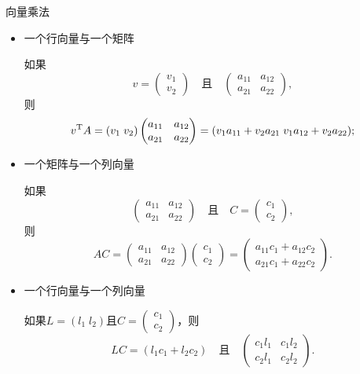   {\kaishu 向量乘法}
  \begin{itemize}\parindent=2em
    \item {\kaishu 一个行向量与一个矩阵}

    如果
    \[
      v = \begin{pmatrix}
        v_1 \\ v_2
      \end{pmatrix}\quad \text{且}\quad
      \begin{pmatrix}
        a_{11} & a_{12} \\
        a_{21} & a_{22}
      \end{pmatrix},
    \]
    则
    \[
      v^{\mathrm T} A = (v_1\;v_2)\begin{pmatrix}
        a_{11} & a_{12} \\
        a_{21} & a_{22}
      \end{pmatrix} =
      (v_1a_{11}+v_2a_{21}\;v_1a_{12}+v_2a_{22});
    \]
    \item {\kaishu 一个矩阵与一个列向量}

    如果
    \[
      \begin{pmatrix}
        a_{11} & a_{12} \\
        a_{21} & a_{22}
      \end{pmatrix} \quad \text{且}\quad
      C = \begin{pmatrix}
        c_1 \\ c_2
      \end{pmatrix},
    \]
    则
    \[
      AC = \begin{pmatrix}
        a_{11} & a_{12} \\
        a_{21} & a_{22}
      \end{pmatrix}\begin{pmatrix}
        c_1 \\ c_2
      \end{pmatrix} = \begin{pmatrix}
        a_{11}c_1 + a_{12}c_2 \\
        a_{21}c_1 + a_{22}c_2
      \end{pmatrix}.
    \]
    \item {\kaishu 一个行向量与一个列向量}

    如果$L=(l_1\;l_2)$且$C=\begin{pmatrix}
      c_1 \\ c_2
    \end{pmatrix}$，则
    \[
      LC = (l_1c_1+l_2c_2)\quad \text{且}\quad\begin{pmatrix}
        c_1l_1 & c_1l_2 \\
        c_2l_1 & c_2l_2
      \end{pmatrix}.
    \]
  \end{itemize}

